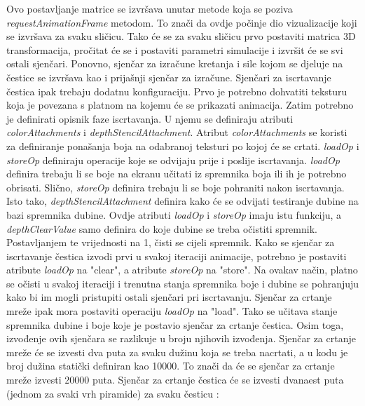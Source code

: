 \documentclass{foi}
\begin{document}
Ovo postavljanje matrice se izvršava unutar metode koja se poziva \textit{requestAnimationFrame} metodom. To znači da ovdje počinje dio vizualizacije koji se izvršava za svaku sličicu. Tako će se za svaku sličicu prvo postaviti matrica 3D transformacija, pročitat će se i postaviti parametri simulacije i izvršit će se svi ostali sjenčari. Ponovno, sjenčar za izračune kretanja i sile kojom se djeluje na čestice se izvršava kao i prijašnji sjenčar za izračune. Sjenčari za iscrtavanje čestica ipak trebaju dodatnu konfiguraciju. Prvo je potrebno dohvatiti teksturu koja je povezana s platnom na kojemu će se prikazati animacija. Zatim potrebno je definirati opisnik faze iscrtavanja. U njemu se definiraju atributi \textit{colorAttachments} i \textit{depthStencilAttachment}. Atribut \textit{colorAttachments} se koristi za definiranje ponašanja boja na odabranoj teksturi po kojoj će se crtati. \textit{loadOp} i \textit{storeOp} definiraju operacije koje se odvijaju prije i poslije iscrtavanja. \textit{loadOp} definira trebaju li se boje na ekranu učitati iz spremnika boja ili ih je potrebno obrisati. Slično, \textit{storeOp} definira trebaju li se boje pohraniti nakon iscrtavanja. Isto tako, \textit{depthStencilAttachment} definira kako će se odvijati testiranje dubine na bazi spremnika dubine. Ovdje atributi \textit{loadOp} i \textit{storeOp} imaju istu funkciju, a \textit{depthClearValue} samo definira do koje dubine se treba očistiti spremnik. Postavljanjem te vrijednosti na 1, čisti se cijeli spremnik. Kako se sjenčar za iscrtavanje čestica izvodi prvi u svakoj iteraciji animacije, potrebno je postaviti atribute \textit{loadOp} na "clear", a atribute \textit{storeOp} na "store". Na ovakav način, platno se očisti u svakoj iteraciji i trenutna stanja spremnika boje i dubine se pohranjuju kako bi im mogli pristupiti ostali sjenčari pri iscrtavanju. Sjenčar za crtanje mreže ipak mora postaviti operaciju \textit{loadOp} na "load". Tako se učitava stanje spremnika dubine i boje koje je postavio sjenčar za crtanje čestica. Osim toga, izvođenje ovih sjenčara se razlikuje u broju njihovih izvođenja. Sjenčar za crtanje mreže će se izvesti dva puta za svaku dužinu koja se treba nacrtati, a u kodu je broj dužina statički definiran kao 10000. To znači da će se sjenčar za crtanje mreže izvesti 20000 puta. Sjenčar za crtanje čestica će se izvesti dvanaest puta (jednom za svaki vrh piramide) za svaku česticu \parencite{ItCGWebGPU3D}:
\end{document}
